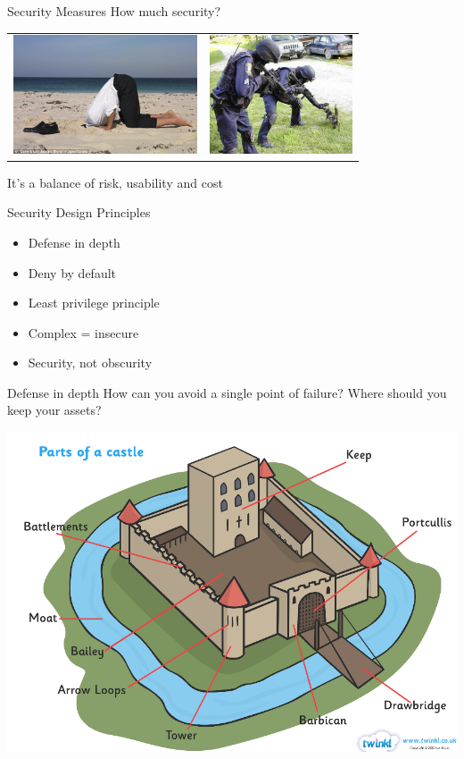 \documentclass{beamer}
\begin{document}
\begin{frame}{Security Measures}
How much security?
\begin{tabular}{c c}
\includegraphics[height = 3.5cm]{ostrich.jpg}
& \includegraphics[height = 3.5cm]{cat.jpg}
\end{tabular}
\centering
It's a balance of risk, usability and cost 
\end{frame}

\begin{frame}{Security Design Principles}
  \begin{itemize}
    \item Defense in depth
    \item Deny by default
    \item Least privilege principle
    \item Complex = insecure
    \item Security, not obscurity
  \end{itemize}
\end{frame}

\begin{frame}{Defense in depth}
How can you avoid a single point of failure? Where should you keep your assets?
\begin{center}
\includegraphics[width=0.7\linewidth]{castle.png}
\end{center}
\end{frame}
\end{document}
